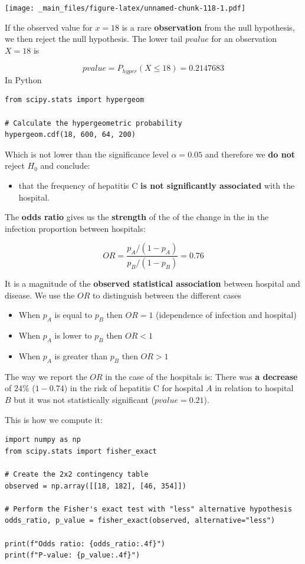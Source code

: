 \documentclass[
]{book}
\providecommand{\tightlist}{%
  \setlength{\itemsep}{0pt}\setlength{\parskip}{0pt}}
\begin{document}
\texttt{[image: \_main\_files/figure-latex/unnamed-chunk-118-1.pdf]}

If the observed value for \(x=18\) is a rare \textbf{observation} from the null hypothesis, we then reject the null hypothesis. The lower tail \(pvalue\) for an observation \(X=18\) is

\[pvalue=P_{hyper}(X \leq 18) =0.2147683\]
In Python

\begin{verbatim}
from scipy.stats import hypergeom

# Calculate the hypergeometric probability
hypergeom.cdf(18, 600, 64, 200)
\end{verbatim}

Which is not lower than the significance level \(\alpha=0.05\) and therefore we \textbf{do not} reject \(H_0\) and conclude:

\begin{itemize}
\tightlist
\item
  that the frequency of hepatitis C \textbf{is not significantly associated} with the hospital.
\end{itemize}

The \textbf{odds ratio} gives us the \textbf{strength} of the of the change in the in the infection proportion between hospitals:

\[OR=\frac{p_A/(1-p_A)}{p_B/(1-p_B)}=0.76\]

It is a magnitude of the \textbf{observed statistical association} between hospital and disease. We use the \(OR\) to distinguish between the different cases

\begin{itemize}
\tightlist
\item
  When \(p_A\) is equal to \(p_B\) then \(OR=1\) (idependence of infection and hospital)
\item
  When \(p_A\) is lower to \(p_B\) then \(OR<1\)
\item
  When \(p_A\) is greater than \(p_B\) then \(OR>1\)
\end{itemize}

The way we report the \(OR\) in the case of the hospitals is: There was \textbf{a decrease} of \(24\%\) (\(1-0.74\)) in the risk of hepatitis C for hospital \(A\) in relation to hospital \(B\) but it was not statistically significant (\(pvalue=0.21\)).

This is how we compute it:

\begin{verbatim}
import numpy as np
from scipy.stats import fisher_exact

# Create the 2x2 contingency table
observed = np.array([[18, 182], [46, 354]])

# Perform the Fisher's exact test with "less" alternative hypothesis
odds_ratio, p_value = fisher_exact(observed, alternative="less")

print(f"Odds ratio: {odds_ratio:.4f}")
print(f"P-value: {p_value:.4f}")
\end{verbatim}
\end{document}
